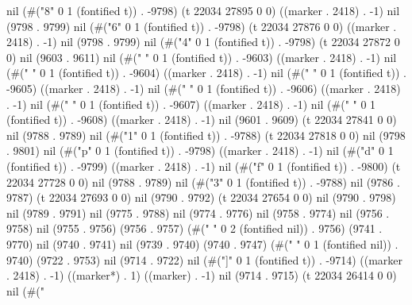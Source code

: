 nil (#("8" 0 1 (fontified t)) . -9798) (t 22034 27895 0 0) ((marker . 2418) . -1) nil (9798 . 9799) nil (#("6" 0 1 (fontified t)) . -9798) (t 22034 27876 0 0) ((marker . 2418) . -1) nil (9798 . 9799) nil (#("4" 0 1 (fontified t)) . -9798) (t 22034 27872 0 0) nil (9603 . 9611) nil (#(" " 0 1 (fontified t)) . -9603) ((marker . 2418) . -1) nil (#(" " 0 1 (fontified t)) . -9604) ((marker . 2418) . -1) nil (#(" " 0 1 (fontified t)) . -9605) ((marker . 2418) . -1) nil (#(" " 0 1 (fontified t)) . -9606) ((marker . 2418) . -1) nil (#(" " 0 1 (fontified t)) . -9607) ((marker . 2418) . -1) nil (#(" " 0 1 (fontified t)) . -9608) ((marker . 2418) . -1) nil (9601 . 9609) (t 22034 27841 0 0) nil (9788 . 9789) nil (#("1" 0 1 (fontified t)) . -9788) (t 22034 27818 0 0) nil (9798 . 9801) nil (#("p" 0 1 (fontified t)) . -9798) ((marker . 2418) . -1) nil (#("d" 0 1 (fontified t)) . -9799) ((marker . 2418) . -1) nil (#("f" 0 1 (fontified t)) . -9800) (t 22034 27728 0 0) nil (9788 . 9789) nil (#("3" 0 1 (fontified t)) . -9788) nil (9786 . 9787) (t 22034 27693 0 0) nil (9790 . 9792) (t 22034 27654 0 0) nil (9790 . 9798) nil (9789 . 9791) nil (9775 . 9788) nil (9774 . 9776) nil (9758 . 9774) nil (9756 . 9758) nil (9755 . 9756) (9756 . 9757) (#("	 " 0 2 (fontified nil)) . 9756) (9741 . 9770) nil (9740 . 9741) nil (9739 . 9740) (9740 . 9747) (#("	" 0 1 (fontified nil)) . 9740) (9722 . 9753) nil (9714 . 9722) nil (#("]" 0 1 (fontified t)) . -9714) ((marker . 2418) . -1) ((marker*) . 1) ((marker) . -1) nil (9714 . 9715) (t 22034 26414 0 0) nil (#("
